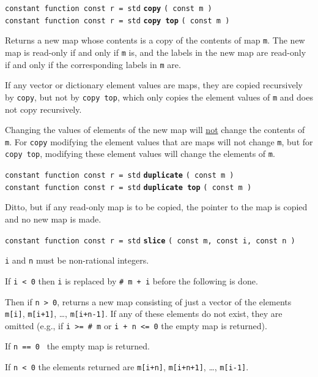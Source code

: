 \documentclass[12pt]{article}
\newcommand{\ttkey}[1]{{\tt \bfseries #1}}
\newenvironment{indpar}[1][0.3in]%
	{\begin{list}{}%
		     {\setlength{\itemsep}{0in}%
		      \setlength{\topsep}{0in}%
		      \setlength{\parsep}{1ex}%
		      \setlength{\labelwidth}{#1}%
		      \setlength{\leftmargin}{#1}%
		      \addtolength{\leftmargin}{\labelsep}}%
	 \item}%
	{\end{list}}
\begin{document}
{\tt constant function const r = std} \ttkey{copy} {\tt ( const m )} \\
{\tt constant function const r = std} \ttkey{copy top} {\tt ( const m )} %
\label{MAP-COPY}
\begin{indpar}
Returns a new map whose contents is a copy of the contents of
map {\tt m}.  The new map is read-only if and only if {\tt m} is,
and the labels in the new map are read-only if and only if the
corresponding labels in {\tt m} are.

If any vector or dictionary element values are maps, they are
copied recursively by {\tt copy}, but not by
{\tt copy top}, which only copies the element values of {\tt m}
and does not copy recursively.

Changing the values of elements of the new map will \underline{not} change
the contents of {\tt m}.  For {\tt copy} modifying the element values
that are maps will not change {\tt m}, but for {\tt copy top},
modifying these element values will change the elements of {\tt m}.

\end{indpar}

{\tt constant function const r = std} \ttkey{duplicate} {\tt ( const m )} \\
{\tt constant function const r = std} \ttkey{duplicate top} {\tt ( const m )}
\begin{indpar}
Ditto, but if any read-only map is to be copied, the pointer
to the map is copied and no new map is made.
\end{indpar}

{\tt constant function const r = std} \ttkey{slice}
    {\tt ( const m, const i, const n )}
\begin{indpar}
{\tt i} and {\tt n} must be non-rational integers.

If {\tt i < 0} then {\tt i} is replaced by {\tt \# m + i} before the
following is done.

Then if {\tt n > 0}, returns a new map consisting of just a vector of the
elements {\tt m[i]}, {\tt m[i+1]}, \ldots, {\tt m[i+n-1]}.
If any of these elements do not exist, they are omitted (e.g.,
if {\tt i >= \# m} or {\tt i + n <= 0} the empty map is returned).

If {\tt n == 0 } the empty map is returned.

If {\tt n < 0} the elements returned are
{\tt m[i+n]}, {\tt m[i+n+1]}, \ldots, {\tt m[i-1]}.

\end{indpar}
\end{document}
